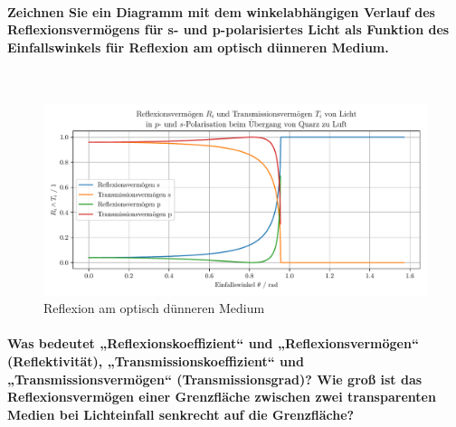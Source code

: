 \documentclass[a4paper, 11pt, ngerman, parskip=half-]{scrartcl}
\begin{document}
\paragraph{Zeichnen Sie ein Diagramm mit dem winkelabhängigen Verlauf des Reflexionsvermögens für s- und p-polarisiertes Licht als Funktion des Einfallswinkels für Reflexion am optisch dünneren Medium.}~

\begin{figure}[H]
    \centering
    \begin{samepage}
        \includegraphics[width=\textwidth]{image/15/Quarz_zu_Luft.pdf}
        \caption{Reflexion am optisch dünneren Medium}
        \label{fig:reflexion_duenn}
    \end{samepage}
\end{figure}


\paragraph{Was bedeutet „Reflexionskoeffizient“ und „Reflexionsvermögen“ (Reflektivität), „Transmissionskoeffizient“ und „Transmissionsvermögen“ (Transmissionsgrad)? Wie groß ist das Reflexionsvermögen einer Grenzfläche zwischen zwei transparenten Medien bei Lichteinfall senkrecht auf die Grenzfläche?}~
\end{document}
